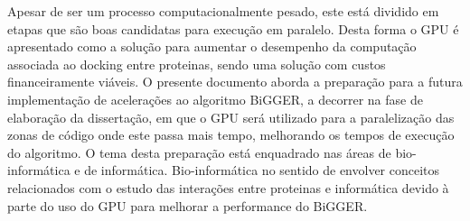  Apesar de ser um processo computacionalmente pesado, este está dividido em etapas que são boas candidatas para execução em paralelo. Desta forma o GPU é apresentado como a solução para aumentar o desempenho da computação associada ao docking entre proteinas, sendo uma solução com custos financeiramente viáveis.
O presente documento aborda a preparação para a futura implementação de acelerações ao algoritmo BiGGER, a decorrer na fase de elaboração da dissertação, em que o GPU será utilizado para a paralelização das zonas de código onde este passa mais tempo, melhorando os tempos de execução do algoritmo.
O tema desta preparação está enquadrado nas áreas de bio-informática e de informática. Bio-informática no sentido de envolver conceitos relacionados com o estudo das interações entre proteinas e informática devido à parte do uso do GPU para melhorar a performance do BiGGER.

